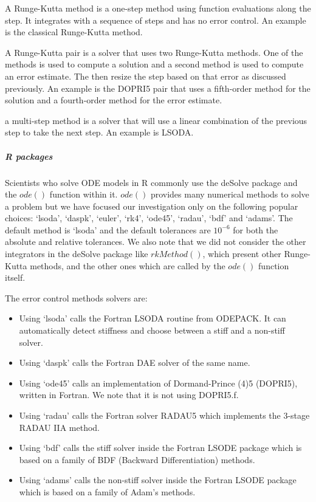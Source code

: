 A Runge-Kutta method is a one-step method using function evaluations along the step. It integrates with a sequence of steps and has no error control. An example is the classical Runge-Kutta method.

A Runge-Kutta pair is a solver that uses two Runge-Kutta methods. One of the methods is used to compute a solution and a second method is used to compute an error estimate. The then resize the step based on that error as discussed previously. An example is the DOPRI5 pair that uses a fifth-order method for the solution and a fourth-order method for the error estimate.

a multi-step method is a solver that will use a linear combination of the previous step to take the next step. An example is LSODA.


\subparagraph{R packages}
Scientists who solve ODE models in R commonly use the deSolve package and the $ode()$ function within it.
$ode()$ provides many numerical methods to solve a problem but we have focused our investigation only on the following popular choices: `lsoda', `daspk', `euler', `rk4', `ode45', `radau', `bdf' and `adams'. The default method is `lsoda' and the default tolerances are $10^{-6}$ for both the absolute and relative tolerances. We also note that we did not consider the other integrators in the deSolve package like $rkMethod()$, which present other Runge-Kutta methods, and the other ones which are called by the $ode()$ function itself.

The error control methods solvers are:
\begin{itemize}
\item Using `lsoda' calls the Fortran LSODA routine from ODEPACK. It can automatically detect stiffness and choose between a stiff and a non-stiff solver.
\item Using `daspk' calls the Fortran DAE solver of the same name.
\item Using `ode45' calls an implementation of Dormand-Prince (4)5 (DOPRI5), written in Fortran. We note that it is not using DOPRI5.f.
\item Using `radau' calls the Fortran solver RADAU5 which implements the 3-stage RADAU IIA method.
\item Using `bdf' calls the stiff solver inside the Fortran LSODE package which is based on a family of BDF (Backward Differentiation) methods.
\item Using `adams' calls the non-stiff solver inside the Fortran LSODE package which is based on a family of Adam's methods.
\end{itemize}

